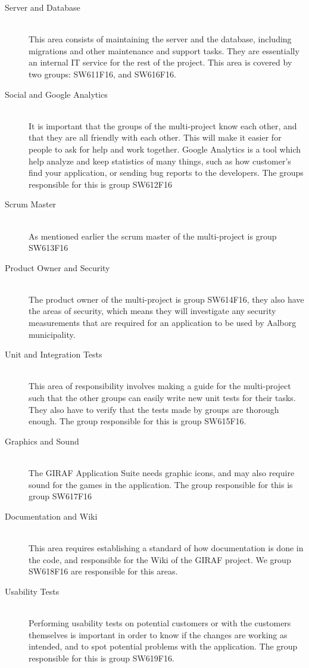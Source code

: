 \begin{description}
	\item[Server and Database] \hfill \\
	This area consists of maintaining the server and the database, including migrations and other maintenance and support tasks. They are essentially an internal IT service for the rest of the project. This area is covered by two groups: SW611F16, and SW616F16.
	\item[Social and Google Analytics] \hfill \\
	It is important that the groups of the multi-project know each other, and that they are all friendly with each other. 
	This will make it easier for people to ask for help and work together. 
	Google Analytics is a tool which help analyze and keep statistics of many things, such as how customer's find your application, or sending bug reports to the developers.
	The groups responsible for this is group SW612F16
	\item[Scrum Master] \hfill \\
	As mentioned earlier the scrum master of the multi-project is group SW613F16
	\item[Product Owner and Security] \hfill \\
	The product owner of the multi-project is group SW614F16, they also have the areas of security, which means they will investigate any security measurements that are required for an application to be used by Aalborg municipality.
	\item[Unit and Integration Tests] \hfill \\
	This area of responsibility involves making a guide for the multi-project such that the other groups can easily write new unit tests for their tasks.
	They also have to verify that the tests made by groups are thorough enough.
	The group responsible for this is group SW615F16.
	\item[Graphics and Sound] \hfill \\
	The GIRAF Application Suite needs graphic icons, and may also require sound for the games in the application. 
	The group responsible for this is group SW617F16
	\item[Documentation and Wiki] \hfill \\
	This area requires establishing a standard of how documentation is done in the code, and responsible for the Wiki of the GIRAF project. We group SW618F16 are responsible for this areas.
	\item[Usability Tests] \hfill \\
	Performing usability tests on potential customers or with the customers themselves is important in order to know if the changes are working as intended, and to spot potential problems with the application. The group responsible for this is group SW619F16.	
\end{description}

